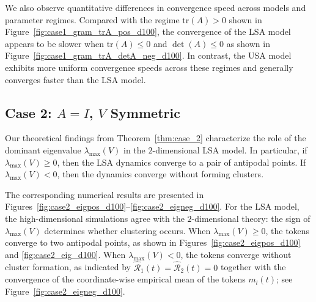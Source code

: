 \documentclass[10pt]{article}
\theoremstyle{definition}
\theoremstyle{definition}
\numberwithin{equation}{section}
\newcommand{\blue}{\color{blue}}
\newcommand{\CR}{\mathcal{R}}
\newcommand{\tr}[1]{\mathrm{tr}(#1)}
\newcommand{\lambdaMax}{\lambda_{\mathrm{max}}}
\newcommand{\SX}[1]{\marginpar{\scriptsize\textcolor{darkgreen}{SX: {#1}}}}
\newcommand{\SA}[1]{\marginpar{\scriptsize\textcolor{cyan}{SA: {#1}}}}
\begin{document}
We also observe quantitative differences in convergence speed across models and parameter regimes.
Compared with the regime $\mathrm{tr}(A) > 0$ shown in Figure~\ref{fig:case1_gram_trA_pos_d100}, the convergence of the LSA model appears to be slower when $\tr{A} \leq 0$ and $\det(A) \leq 0$ as shown in Figure~\ref{fig:case1_gram_trA_detA_neg_d100}.
In contrast, the USA model exhibits more uniform convergence speeds across these regimes and generally converges faster than the LSA model.





\subsection{Case 2: \texorpdfstring{$A = I$, $V$}{AV} Symmetric}
\label{sec:exp_case2}

Our theoretical findings from Theorem~\ref{thm:case_2} characterize the role of the dominant eigenvalue $\lambdaMax(V)$ in the $2$-dimensional LSA model. 
In particular, if $\lambdaMax(V) \geq 0$, then the LSA dynamics converge to a pair of antipodal points.
If $\lambdaMax(V) < 0$, then the dynamics converge without forming clusters.

 
The corresponding numerical results are presented in Figures~\ref{fig:case2_eigpos_d100}--\ref{fig:case2_eigneg_d100}.
For the LSA model, the high-dimensional simulations agree with the $2$-dimensional theory: the sign of $\lambdaMax(V)$ determines whether clustering occurs. 
When $\lambda_{\max}(V) \geq 0$, the tokens converge to two antipodal points, as shown in Figures~\ref{fig:case2_eigpos_d100} and \ref{fig:case2_eig_d100}. 
When $\lambda_{\max}(V) < 0$, the tokens converge without cluster formation, as indicated by $\widehat{\CR}_1(t) = \widehat{\CR}_2(t) = 0$ together with the convergence of the coordinate-wise empirical mean of the tokens $m_l(t)$; see Figure~\ref{fig:case2_eigneg_d100}.  
\end{document}
